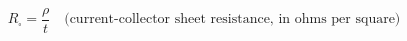 \documentclass[preview]{standalone}
\begin{document}
\[R_\square = \frac{\rho}{t} \quad \text{(current-collector sheet resistance, in ohms per square)} \tag{4.3}\]
\end{document}
